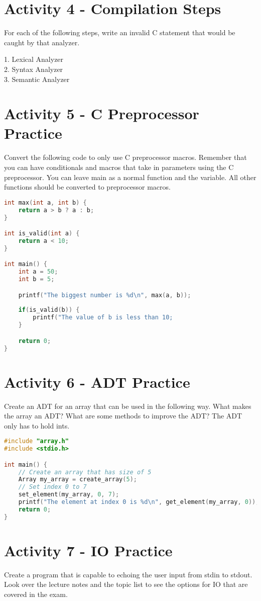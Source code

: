 \documentclass[]{article}
\begin{document}
\section*{Activity 4 - Compilation Steps}
For each of the following steps, write an invalid C statement that would be caught by that
analyzer. \par

1. Lexical Analyzer \\

2. Syntax Analyzer \\

3. Semantic Analyzer \\

\section*{Activity 5 - C Preprocessor Practice}
Convert the following code to only use C preprocessor macros. Remember that you can have
conditionals and macros that take in parameters using the C preprocessor. You can leave main
as a normal function and the variable. All other functions should be converted to preprocessor macros.

\begin{lstlisting}[language=C]
int max(int a, int b) {
    return a > b ? a : b;
}

int is_valid(int a) {
    return a < 10;
}

int main() {
    int a = 50;
    int b = 5;

    printf("The biggest number is %d\n", max(a, b));
    
    if(is_valid(b)) {
        printf("The value of b is less than 10;
    }

    return 0;
}
\end{lstlisting}

\section*{Activity 6 - ADT Practice}
Create an ADT for an array that can be used in the following way. What makes the array an ADT?
What are some methods to improve the ADT? The ADT only has to hold ints.

\begin{lstlisting}[language=C]
#include "array.h"
#include <stdio.h>

int main() {
    // Create an array that has size of 5
    Array my_array = create_array(5);
    // Set index 0 to 7
    set_element(my_array, 0, 7);
    printf("The element at index 0 is %d\n", get_element(my_array, 0));
    return 0;
}
\end{lstlisting}

\section*{Activity 7 - IO Practice}
Create a program that is capable to echoing the user input from stdin to stdout. Look over the
lecture notes and the topic list to see the options for IO that are covered in the exam.
\end{document}
